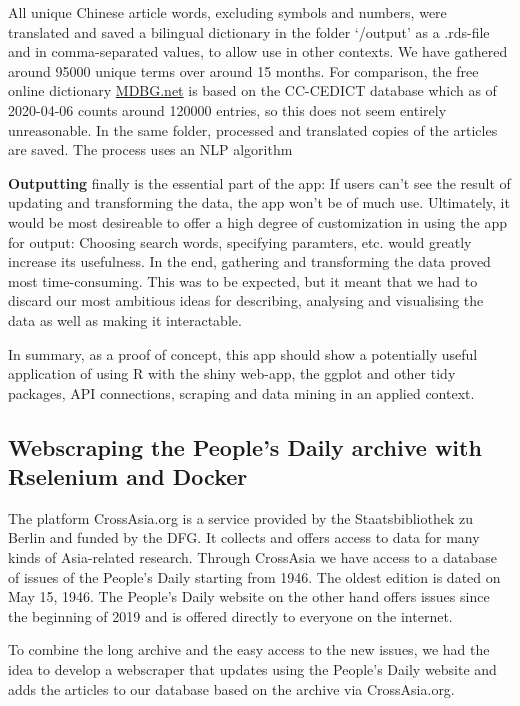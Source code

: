 \documentclass[12pt,a4paper]{article}
\begin{document}
All unique Chinese article words, excluding symbols and numbers, were translated and saved a bilingual dictionary in the folder `/output' as a .rds-file and in comma-separated values, to allow use in other contexts. We have gathered around 95000 unique terms over around 15 months. For comparison, the free online dictionary \href{https://www.mdbg.net/chinese/dictionary?page=cedict}{MDBG.net} is based on the CC-CEDICT database which as of 2020-04-06 counts around 120000 entries, so this does not seem entirely unreasonable. In the same folder, processed and translated copies of the articles are saved. The process uses an NLP algorithm

\textbf{Outputting} finally is the essential part of the app: If users can't see the result of updating and transforming the data, the app won't be of much use. Ultimately, it would be most desireable to offer a high degree of customization in using the app for output: Choosing search words, specifying paramters, etc. would greatly increase its usefulness. In the end, gathering and transforming the data proved most time-consuming. This was to be expected, but it meant that we had to discard our most ambitious ideas for describing, analysing and visualising the data as well as making it interactable.

In summary, as a proof of concept, this app should show a potentially useful application of using R with the shiny web-app, the ggplot and other tidy packages, API connections, scraping and data mining in an applied context.

\hypertarget{webscraping-the-peoples-daily-archive-with-rselenium-and-docker}{%
\subsection{Webscraping the People's Daily archive with Rselenium and Docker}\label{webscraping-the-peoples-daily-archive-with-rselenium-and-docker}}

The platform CrossAsia.org is a service provided by the Staatsbibliothek zu Berlin and funded by the DFG. It collects and offers access to data for many kinds of Asia-related research. Through CrossAsia we have access to a database of issues of the People's Daily starting from 1946. The oldest edition is dated on May 15, 1946. The People's Daily website on the other hand offers issues since the beginning of 2019 and is offered directly to everyone on the internet.

To combine the long archive and the easy access to the new issues, we had the idea to develop a webscraper that updates using the People's Daily website and adds the articles to our database based on the archive via CrossAsia.org.
\end{document}

